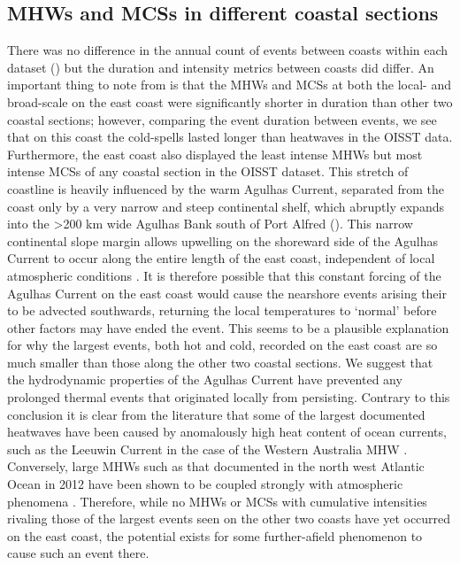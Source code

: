 \documentclass[a4paper,10pt,review]{elsarticle}
\begin{document}
\subsection{MHWs and MCSs in different coastal sections}
There was no difference in the annual count of events between coasts within each dataset () but the duration and intensity metrics between coasts did differ. An important thing to note from  is that the MHWs and MCSs at both the local- and broad-scale on the east coast were significantly shorter in duration than other two coastal sections; however, comparing the event duration between events, we see that on this coast the cold-spells lasted longer than heatwaves in the OISST data. Furthermore, the east coast also displayed the least intense MHWs but most intense MCSs of any coastal section in the OISST dataset. This stretch of coastline is heavily influenced by the warm Agulhas Current, separated from the coast only by a very narrow and steep continental shelf, which abruptly expands into the >200 km wide Agulhas Bank south of Port Alfred (). This narrow continental slope margin allows upwelling on the shoreward side of the Agulhas Current to occur along the entire length of the east coast, independent of local atmospheric conditions \citep{Lutjeharms2000}. It is therefore possible that this constant forcing of the Agulhas Current on the east coast would cause the nearshore events arising their to be advected southwards, returning the local temperatures to `normal' before other factors may have ended the event. This seems to be a plausible explanation for why the largest events, both hot and cold, recorded on the east coast are so much smaller than those along the other two coastal sections. We suggest that the hydrodynamic properties of the Agulhas Current have prevented any prolonged thermal events that originated locally from persisting. Contrary to this conclusion it is clear from the literature that some of the largest documented heatwaves have been caused by anomalously high heat content of ocean currents, such as the Leeuwin Current in the case of the Western Australia MHW \citep{Feng2013, Pearce2013, Wernberg2013}. Conversely, large MHWs such as that documented in the north west Atlantic Ocean in 2012 have been shown to be coupled strongly with atmospheric phenomena \citep{Mills2012, Chen2014, Chen2015}. Therefore, while no MHWs or MCSs with cumulative intensities rivaling those of the largest events seen on the other two coasts have yet occurred on the east coast, the potential exists for some further-afield phenomenon to cause such an event there.
\end{document}
